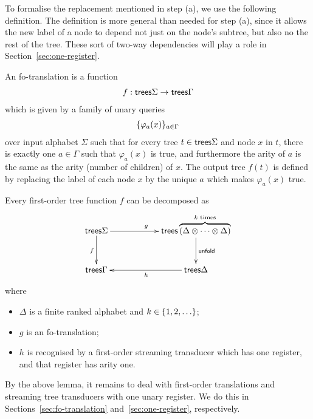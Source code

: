 To formalise the replacement mentioned in step (a), we use the following definition. The definition is more general than needed for step (a), since it allows the new label of a node to depend not just on the node's subtree, but also no the rest of the tree. These sort of two-way dependencies will play a role in Section~\ref{sec:one-register}.


\begin{definition}[Fo translation]
     An fo-translation is a  function
    \begin{align*}
      f :   \mathsf {trees} \Sigma \to \mathsf {trees} \Gamma
    \end{align*}
    which is given by a family of unary queries 
    \begin{align*}
        \{\varphi_a(x)\}_{a \in \Gamma}
    \end{align*}
    over input alphabet $\Sigma$ such that for every tree $t \in \mathsf {trees} \Sigma$ and node $x$ in $t$, there is exactly one $a \in \Gamma$ such that $\varphi_a(x)$ is true, and furthermore the arity of $a$ is the same as the arity (number of children) of $x$.  The output tree $f(t)$ is defined by replacing the label of each node $x$ by the unique $a$ which makes $\varphi_a(x)$ true.
\end{definition}




\begin{lemma}\label{lem:decomposition-of-fo-transductions} Every first-order tree function $f$  can be decomposed as
    \begin{align*}
        \xymatrix@C=2cm{\trees \Sigma \ar[d]_f \ar[r]^g& \trees \overbrace{(\Delta \otimes \cdots \otimes \Delta)}^{\text{$k$ times}} \ar[d]^{\mathsf{unfold}} \\   \trees \Gamma  & \trees \Delta \ar[l]^h}
    \end{align*}
    where 
    \begin{itemize}
        \item $\Delta$ is a finite ranked alphabet and $k \in \{1,2,\ldots\}$;
        \item $g$ is an fo-translation;
        \item $h$ is recognised by a first-order streaming transducer which has one register, and that register has arity one.
    \end{itemize}
\end{lemma}

By the above lemma, it remains to deal with first-order translations and streaming tree transducers with one unary register. We do this in Sections~\ref{sec:fo-translation} and~\ref{sec:one-register}, respectively.
